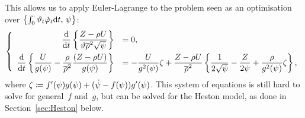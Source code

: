 This allows us to apply Euler-Lagrange to the problem seen as an optimisation over $\left\{\int_0^\cdot \vartheta_t \dot{\varphi}_t \mathrm{d} t,\,\psi\right\}$:
\begin{equation}\label{eq:LDPLargeTimeGeneral}
\left\{
\begin{array}{rl}
\displaystyle \frac{\mathrm{d}}{\mathrm{d} t}\left\{
\frac{Z - \rho U}{\vartheta \overline{\rho}^2\sqrt{\psi}} \right\} &= 0, \\[10pt]
\displaystyle \frac{\mathrm{d}}{\mathrm{d} t}\left\{ \frac{U}{g(\psi)} - \frac{\rho}{\overline{\rho}^2}\frac{(Z - \rho U)}{g(\psi)} \right\}
&= \displaystyle - \frac{U}{g^2(\psi)}\zeta + \frac{Z-\rho U}{\overline{\rho}^2}\left\{ \frac{1}{2\sqrt{\psi}} - \frac{Z}{2\psi} + \frac{\rho}{g^2(\psi)}\zeta \right\},
\end{array}
\right.
\end{equation}
where $\zeta \coloneqq f'(\psi)g(\psi) + (\dot{\psi}-f(\psi))g'(\psi)$. This system of equations is still hard to solve for general~$f$ and~$g$, 
but can be solved for the Heston model,
as done in Section~\ref{sec:Heston} below.

